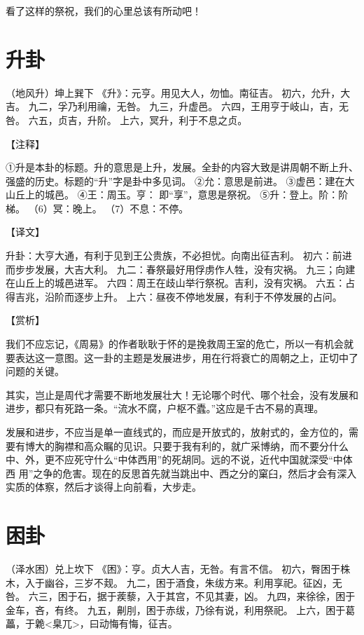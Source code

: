 \documentclass[a4paper,12pt,UTF8,twoside]{ctexbook}
\begin{document}
看了这样的祭祝，我们的心里总该有所动吧！

\chapter{升卦}

（地风升）坤上巽下
《升》：元亨。用见大人，勿恤。南征吉。
初六，允升，大吉。
九二，孚乃利用禴，无咎。
九三，升虚邑。
六四，王用亨于岐山，吉，无咎。
六五，贞吉，升阶。
上六，冥升，利于不息之贞。

【注释】

①升是本卦的标题。升的意思是上升，发展。全卦的内容大致是讲周朝不断上升、强盛的历史。标题的“升”字是卦中多见词。
②允：意思是前进。
③虚邑：建在大山丘上的城邑。
④王：周玉。亨： 即“享”，意思是祭祝。
⑤升：登上。阶：阶梯。
（6）冥：晚上。
（7）不息：不停。

【译文】

升卦：大亨大通，有利于见到王公贵族，不必担忧。向南出征吉利。
初六：前进而步步发展，大吉大利。
九二：春祭最好用俘虏作人牲，没有灾祸。
九三；向建在山丘上的城邑进军。
六四：周王在歧山举行祭祝。吉利，没有灾祸。
六五：占得吉兆，沿阶而逐步上升。
上六：昼夜不停地发展，有利于不停发展的占问。

【赏析】

我们不应忘记，《周易》的作者耿耿于怀的是挽救周王室的危亡，所以一有机会就要表达这一意图。这一卦的主题是发展进步，用在行将衰亡的周朝之上，正切中了问题的关键。

其实，岂止是周代才需要不断地发展壮大！无论哪个时代、哪个社会，没有发展和进步，都只有死路一条。“流水不腐，户枢不蠹。”这应是千古不易的真理。

发展和进步，不应当是单一直线式的，而应是开放式的，放射式的，金方位的，需要有博大的胸襟和高众瞩的见识。只要于我有利的，就广采博纳，而不要分什么中、外，更不应死守什么“中体西用”的死胡同。远的不说，近代中国就深受“中体西 用”之争的危害。现在的反思首先就当跳出中、西之分的窠臼，然后才会有深入实质的体察，然后才谈得上向前看，大步走。

\chapter{困卦}

（泽水困）兑上坎下
《困》：亨。贞大人吉，无咎。有言不信。
初六，臀困于株木，入于幽谷，三岁不觌。
九二，困于酒食，朱绂方来。利用享祀。征凶，无咎。
六三，困于石，据于蒺藜，入于其宫，不见其妻，凶。
九四，来徐徐，困于金车，吝，有终。
九五，劓刖，困于赤绂，乃徐有说，利用祭祀。
上六，困于葛藟，于臲<臬兀>，曰动悔有悔，征吉。
\end{document}
